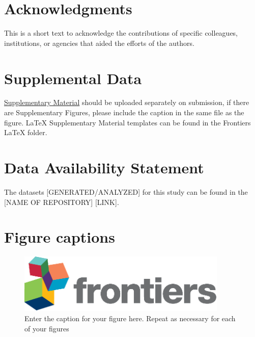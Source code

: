 \documentclass[utf8]{frontiersSCNS}
\begin{document}
\section*{Acknowledgments}
This is a short text to acknowledge the contributions of specific colleagues, institutions, or agencies that aided the efforts of the authors.

\section*{Supplemental Data}
 \href{http://home.frontiersin.org/about/author-guidelines#SupplementaryMaterial}{Supplementary Material} should be uploaded separately on submission, if there are Supplementary Figures, please include the caption in the same file as the figure. LaTeX Supplementary Material templates can be found in the Frontiers LaTeX folder.

\section*{Data Availability Statement}
The datasets [GENERATED/ANALYZED] for this study can be found in the [NAME OF REPOSITORY] [LINK].


 


\section*{Figure captions}


\begin{figure}[h!]
\begin{center}
\includegraphics[width=10cm]{logo1}%
\end{center}
\caption{ Enter the caption for your figure here.  Repeat as  necessary for each of your figures}\label{fig:1}
\end{figure}
\end{document}
